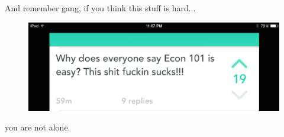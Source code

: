 \documentclass[pdf, handout]{beamer}
\begin{document}
\begin{frame}
	\begin{center}
	
	And remember gang, if you think this stuff is hard...
	
	\pause
	
		\begin{figure}[H]
			\centering
			\includegraphics[scale=.15]{YIKYAK1.png}
		\end{figure}

	
	
		you are not alone.
	\end{center}
	
\end{frame}
\end{document}
